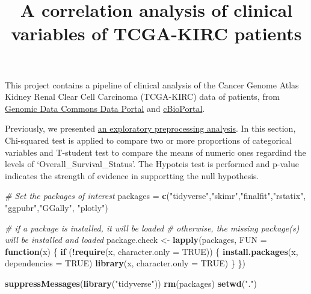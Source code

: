 \documentclass[]{article}
\title{A correlation analysis of clinical variables of TCGA-KIRC patients}
\author{}
\date{\vspace{-2.5em}}
\newenvironment{Shaded}{\begin{snugshade}}{\end{snugshade}}
\newcommand{\KeywordTok}[1]{\textcolor[rgb]{0.13,0.29,0.53}{\textbf{#1}}}
\newcommand{\DataTypeTok}[1]{\textcolor[rgb]{0.13,0.29,0.53}{#1}}
\newcommand{\StringTok}[1]{\textcolor[rgb]{0.31,0.60,0.02}{#1}}
\newcommand{\CommentTok}[1]{\textcolor[rgb]{0.56,0.35,0.01}{\textit{#1}}}
\newcommand{\OtherTok}[1]{\textcolor[rgb]{0.56,0.35,0.01}{#1}}
\newcommand{\ControlFlowTok}[1]{\textcolor[rgb]{0.13,0.29,0.53}{\textbf{#1}}}
\newcommand{\OperatorTok}[1]{\textcolor[rgb]{0.81,0.36,0.00}{\textbf{#1}}}
\newcommand{\NormalTok}[1]{#1}
\begin{document}
\maketitle

This project contains a pipeline of clinical analysis of the Cancer
Genome Atlas Kidney Renal Clear Cell Carcinoma (TCGA-KIRC) data of
patients, from
\href{https://portal.gdc.cancer.gov/exploration?filters=\%7B\%22op\%22\%3A\%22and\%22\%2C\%22content\%22\%3A\%5B\%7B\%22op\%22\%3A\%22in\%22\%2C\%22content\%22\%3A\%7B\%22field\%22\%3A\%22cases.project.project_id\%22\%2C\%22value\%22\%3A\%5B\%22TCGA-KIRC\%22\%5D\%7D\%7D\%5D\%7D}{Genomic
Data Commons Data Portal} and
\href{https://www.cbioportal.org/study/summary?id=kirp_tcga}{cBioPortal}.

Previously, we presented \href{1.preprocessing.md}{an exploratory
preprocessing analysis}. In this section, Chi-squared test is applied to
compare two or more proportions of categorical variables and T-student
test to compare the means of numeric ones regardind the levels of
`Overall\_Survival\_Status'. The Hypoteis test is performed and p-value
indicates the strength of evidence in supportting the null hypothesis.

\begin{Shaded}
\begin{Highlighting}[]
\CommentTok{# Set the packages of interest}
\NormalTok{packages =}\StringTok{ }\KeywordTok{c}\NormalTok{(}\StringTok{"tidyverse"}\NormalTok{,}\StringTok{"skimr"}\NormalTok{,}\StringTok{"finalfit"}\NormalTok{,}\StringTok{"rstatix"}\NormalTok{, }\StringTok{"ggpubr"}\NormalTok{,}\StringTok{"GGally"}\NormalTok{, }\StringTok{"plotly"}\NormalTok{)}

\CommentTok{# if a package is installed, it will be loaded}
\CommentTok{# otherwise, the missing package(s) will be installed and loaded}
\NormalTok{package.check <-}\StringTok{ }\KeywordTok{lapply}\NormalTok{(packages, }\DataTypeTok{FUN =} \ControlFlowTok{function}\NormalTok{(x) \{}
  \ControlFlowTok{if}\NormalTok{ (}\OperatorTok{!}\KeywordTok{require}\NormalTok{(x, }\DataTypeTok{character.only =} \OtherTok{TRUE}\NormalTok{)) \{}
    \KeywordTok{install.packages}\NormalTok{(x, }\DataTypeTok{dependencies =} \OtherTok{TRUE}\NormalTok{)}
    \KeywordTok{library}\NormalTok{(x, }\DataTypeTok{character.only =} \OtherTok{TRUE}\NormalTok{)}
\NormalTok{  \}}
\NormalTok{\})}

\KeywordTok{suppressMessages}\NormalTok{(}\KeywordTok{library}\NormalTok{(}\StringTok{"tidyverse"}\NormalTok{))}
\KeywordTok{rm}\NormalTok{(packages)}
\KeywordTok{setwd}\NormalTok{(}\StringTok{"."}\NormalTok{)}
\end{Highlighting}
\end{Shaded}
\end{document}
